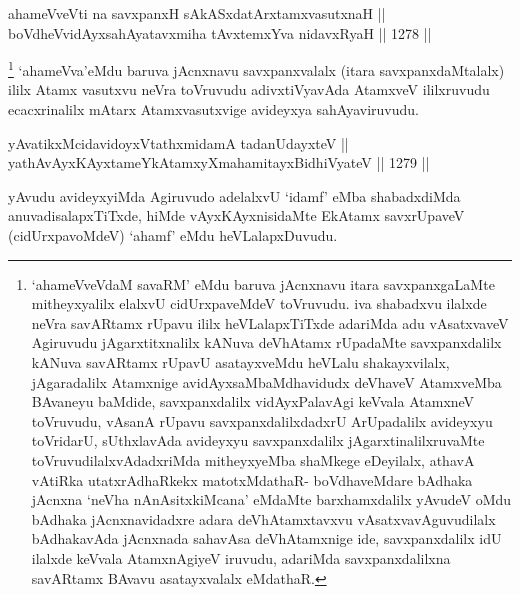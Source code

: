 
\begin{shl}
ahameVveVti na savxpanxH sAkASxdatArx\s \s tamxvasutxnaH || \\
boVdheV\s vidAyxsahAyatavxmiha tAvxtemxYva nidavxRyaH \hfill || 1278 ||  
\end{shl}

\begin{artha}
\footnote{`ahameVveVdaM savaRM' eMdu baruva jAcnxnavu itara savxpanxgaLaMte mitheyxyalilx elalxvU cidUrxpaveMdeV toVruvudu. iva shabadxvu ilalxde neVra savARtamx rUpavu ililx heVLalapxTiTxde adariMda adu vAsatxvaveV Agiruvudu jAgarxtitxnalilx kANuva deVhAtamx rUpadaMte savxpanxdalilx kANuva savARtamx rUpavU asatayxveMdu heVLalu shakayxvilalx, jAgaradalilx Atamxnige avidAyxsaMbaMdhavidudx deVhaveV AtamxveMba BAvaneyu baMdide, savxpanxdalilx vidAyxPalavAgi keVvala AtamxneV toVruvudu, vAsanA rUpavu savxpanxdalilxdadxrU ArUpadalilx avideyxyu toVridarU, sUthxlavAda avideyxyu savxpanxdalilx jAgarxtinalilxruvaMte toVruvudilalxvAdadxriMda mitheyxyeMba shaMkege eDeyilalx, athavA vAtiRka utatxrAdhaRkekx matotxMdathaR- boVdhaveMdare bAdhaka jAcnxna `neVha nAnAsitxkiMcana' eMdaMte barxhamxdalilx yAvudeV oMdu bAdhaka jAcnxnavidadxre adara deVhAtamxtavxvu vAsatxvavAguvudilalx bAdhakavAda jAcnxnada sahavAsa deVhAtamxnige ide, savxpanxdalilx idU ilalxde keVvala AtamxnAgiyeV iruvudu, adariMda savxpanxdalilxna savARtamx BAvavu asatayxvalalx eMdathaR.} `ahameVva'eMdu baruva jAcnxnavu savxpanxvalalx (itara savxpanxdaMtalalx) ililx Atamx vasutxvu neVra toVruvudu adivxtiVyavAda AtamxveV ililxruvudu ecacxrinalilx mAtarx Atamxvasutxvige avideyxya sahAyaviruvudu.
\end{artha}


\begin{shl}
yAvatikxMcidavidoyxVtathxmidamA tadanUdayxteV || \\
yathAvAyxKAyxtameYkAtamxyXmahamitayxBidhiVyateV \hfill || 1279 ||
\end{shl}

\begin{artha}
yAvudu avideyxyiMda Agiruvudo adelalxvU `idamf' eMba shabadxdiMda anuvadisalapxTiTxde, hiMde vAyxKAyxnisidaMte EkAtamx savxrUpaveV (cidUrxpavoMdeV) `ahamf' eMdu heVLalapxDuvudu.
\end{artha}

